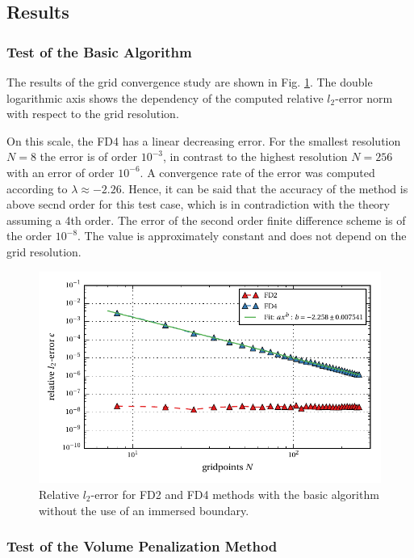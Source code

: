 \clearpage

\subsection{Results}
\subsubsection{Test of the Basic Algorithm}

The results of the grid convergence study are shown in Fig. \ref{fig:ema1}.
The double logarithmic axis shows the dependency of the computed relative $l_2$-error norm
with respect to the grid resolution.

On this scale, the FD4 has a linear decreasing error.
For the smallest resolution $N=8$ the error is of order $10^{-3}$,
in contrast to the highest resolution $N=256$ with an error of order $10^{-6}$.
A convergence rate of the error  was computed  according to $\lambda\approx -2.26$.
Hence, it can be said that the accuracy of the method is above secnd order for this test case,
which is in contradiction with the theory assuming a 4th order.
The error of the second order finite difference scheme is of the order $10^{-8}$.
The value is approximately constant and does not depend on the grid resolution.

\begin{figure}[!bp]
    \centering
    \includegraphics{gfx/immersed_boundary/poiseuille_flow/1_default/relative_l2error.pdf}
    \caption{Relative $l_2$-error for FD2 and FD4 methods with the basic algorithm without the use of an immersed boundary.\label{fig:ema1}}
\end{figure}


\subsubsection{Test of the Volume Penalization Method}

